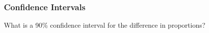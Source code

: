 \documentclass[handout]{beamer}
\newcommand{\blue}[1]{\textcolor{blue2}{#1}}
\newcommand{\phat}{\widehat{p}}
\begin{document}
\begin{frame}[fragile]
\frametitle{Confidence Intervals}
What is a 90\% confidence interval for the difference in proportions?

%
%
%
%

\end{frame}
\end{document}
